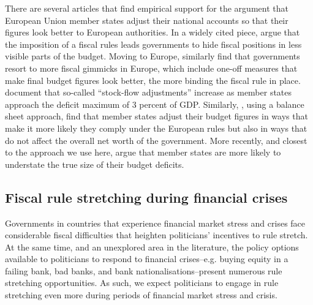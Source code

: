 \documentclass[]{article}
\begin{document}
There are several articles that find empirical support for the argument that European Union member states adjust their national accounts so that their figures look better to European authorities.  In a widely cited piece, \cite{Milesi-Ferretti2003} argue that the imposition of a fiscal rules leads governments to hide fiscal positions in less visible parts of the budget. Moving to Europe, \cite{KoenNoord2005} similarly find that governments resort to more fiscal gimmicks in Europe, which include one-off measures that make final budget figures look better, the more binding the fiscal rule in place. \cite{vonHagenWolff2006} document that so-called ``stock-flow adjustments'' increase as member states approach the  deficit maximum of 3 percent of GDP.  Similarly, \cite{MilesiMoriyama2006}, using a balance sheet approach, find that member states adjust their budget figures in ways that make it more likely they comply under the European rules but also in ways that do not affect the overall net worth of the government.  More recently, and closest to the approach we use here, \cite{DeCastro2013} argue that member states are more likely to understate the true size of their budget deficits.

\subsection{Fiscal rule stretching during financial crises}

Governments in countries that experience financial market stress and crises face considerable fiscal difficulties \cite[see][]{Laeven2012} that heighten politicians' incentives to rule stretch. At the same time, and an unexplored area in the literature, the policy options available to politicians to respond to financial crises--e.g. buying equity in a failing bank, bad banks, and bank nationalisations--present numerous rule stretching opportunities. As such, we expect politicians to engage in rule stretching even more during periods of financial market stress and crisis.
\end{document}
